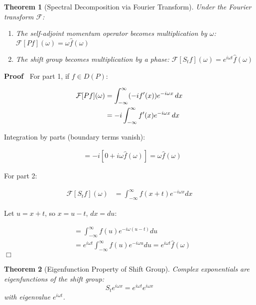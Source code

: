 \documentclass{article}
\newenvironment{proof}{\noindent\textbf{Proof\ }}{\hspace*{\fill}$\Box$\medskip}
\newtheorem{theorem}{Theorem}
\begin{document}
\begin{theorem}
  [Spectral Decomposition via Fourier Transform] Under the Fourier transform
  $\mathcal{F}$:
  \begin{enumerate}
    \item The self-adjoint momentum operator becomes multiplication by
    $\omega$: $\mathcal{F} [Pf] (\omega) = \omega \hat{f} (\omega)$
    
    \item The shift group becomes multiplication by a phase: $\mathcal{F} [S_t
    f] (\omega) = e^{i \omega t}  \hat{f} (\omega)$
  \end{enumerate}
\end{theorem}

\begin{proof}
  For part 1, if $f \in D (P)$:
  
  \begin{align}
    \mathcal{F} [Pf] (\omega) & = \int_{- \infty}^{\infty} (- if' (x)) e^{- i
    \omega x}  \hspace{0.17em} dx \\
    & = - i \int_{- \infty}^{\infty} f' (x) e^{- i \omega x}  \hspace{0.17em}
    dx 
  \end{align}
  
  Integration by parts (boundary terms vanish):
  
  \begin{align}
    & = - i [0 + i \omega \hat{f} (\omega)] = \omega \hat{f} (\omega) 
  \end{align}
  
  For part 2:
  
  \begin{align}
    \mathcal{F} [S_t f] (\omega) & = \int_{- \infty}^{\infty} f (x + t) e^{- i
    \omega x} dx 
  \end{align}
  
  Let $u = x + t$, so $x = u - t$, $dx = du$:
  
  \begin{align}
    & = \int_{- \infty}^{\infty} f (u) e^{- i \omega (u - t)} du \\
    & = e^{i \omega t}  \int_{- \infty}^{\infty} f (u) e^{- i \omega u} du =
    e^{i \omega t}  \hat{f} (\omega) 
  \end{align}
\end{proof}

\begin{theorem}
  [Eigenfunction Property of Shift Group] Complex exponentials are
  eigenfunctions of the shift group:
  \[ S_t e^{i \omega x} = e^{i \omega t} e^{i \omega x} \]
  with eigenvalue $e^{i \omega t}$.
\end{theorem}
\end{document}
